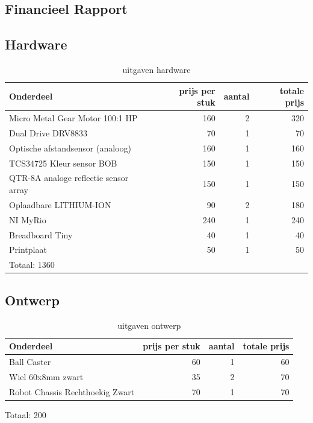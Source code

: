 \documentclass[a4paper,twoside,kulak]{kulakreport}
\begin{document}
\newpage
	\subsection{Financieel Rapport}
	\label{sec: finrap}
	\subsection*{Hardware}
	
	\begin{table}[h]
		
	
	\begin{tabular}{l|r|r|r}
		Onderdeel& prijs per stuk & aantal & totale prijs \\
		\hline
		Micro Metal Gear Motor 100:1 HP&160 & 2 & 320 \\ 
		
		Dual Drive DRV8833 & 70 & 1 & 70 \\
		Optische afstandsensor (analoog) & 160 & 1 & 160 \\
		TCS34725 Kleur sensor BOB & 150 & 1 & 150 \\
		QTR-8A analoge reflectie sensor array & 150 & 1 & 150 \\
		Oplaadbare LITHIUM-ION & 90 & 2 & 180 \\
		NI MyRio  & 240 & 1 & 240 \\
		Breadboard Tiny & 40 & 1 & 40 \\
		Printplaat & 50 & 1 & 50 \\
		Totaal: 1360
	\end{tabular}
\caption{uitgaven hardware}
\label{tab: ess}
\end{table}
	
	
	\subsection*{Ontwerp}
\begin{table}[h]	
	\begin{tabular}{l|r|r|r}
		
		Onderdeel& prijs per stuk & aantal & totale prijs \\
		\hline
		Ball Caster &60 & 1 & 60 \\
		Wiel 60x8mm zwart &35 & 2 & 70 \\
		Robot Chassis Rechthoekig Zwart &70 & 1 & 70 \\
		
	\end{tabular}
	

	Totaal: 200
	
\caption{uitgaven ontwerp}
\label{tab: ontw}
\end{table}
	
\end{document}
